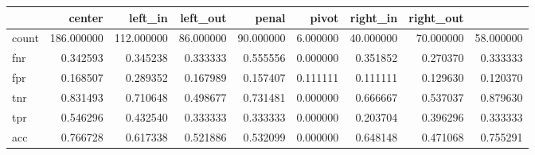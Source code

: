 \begin{tabular}{lrrrrrrrr}
\toprule
{} &      center &    left\_in &   left\_out &     penal &      pivot &   right\_in &  right\_out \\
\midrule
count &  186.000000 &  112.000000 &  86.000000 &  90.000000 &  6.000000 &  40.000000 &  70.000000 &  58.000000 \\
fnr   &    0.342593 &    0.345238 &   0.333333 &   0.555556 &  0.000000 &   0.351852 &   0.270370 &   0.333333 \\
fpr   &    0.168507 &    0.289352 &   0.167989 &   0.157407 &  0.111111 &   0.111111 &   0.129630 &   0.120370 \\
tnr   &    0.831493 &    0.710648 &   0.498677 &   0.731481 &  0.000000 &   0.666667 &   0.537037 &   0.879630 \\
tpr   &    0.546296 &    0.432540 &   0.333333 &   0.333333 &  0.000000 &   0.203704 &   0.396296 &   0.333333 \\
acc   &    0.766728 &    0.617338 &   0.521886 &   0.532099 &  0.000000 &   0.648148 &   0.471068 &   0.755291 \\
\bottomrule
\end{tabular}
